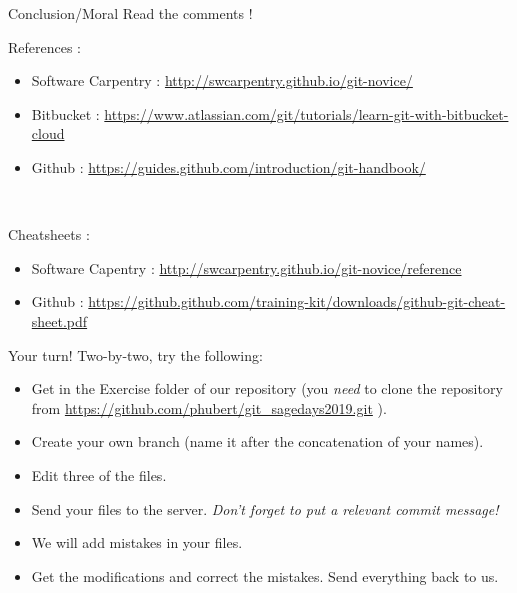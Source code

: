 \documentclass{beamer}
\begin{document}
	\begin{frame}{Conclusion/Moral}
	Read the comments ! \newline
	
	References :
	\begin{itemize}
		\item Software Carpentry : \url{http://swcarpentry.github.io/git-novice/}
		\item Bitbucket :  \url{https://www.atlassian.com/git/tutorials/learn-git-with-bitbucket-cloud}
		\item Github : \url{https://guides.github.com/introduction/git-handbook/}
	\end{itemize}

	~

	Cheatsheets : 
	\begin{itemize}
		\item  Software Capentry : \url{http://swcarpentry.github.io/git-novice/reference}
		\item Github : \url{https://github.github.com/training-kit/downloads/github-git-cheat-sheet.pdf}
	\end{itemize}
	\end{frame}

	\begin{frame}{Your turn!}
	Two-by-two, try the following:
		\begin{itemize}
			\item Get in the Exercise folder of our repository (you \textit{need} to clone the repository from \url{https://github.com/phubert/git_sagedays2019.git} ).
			\item Create your own branch (name it after the concatenation of your names).
			\item Edit three of the files.
			\item Send your files to the server. \textit{Don't forget to put a relevant commit message!}
			\item We will add mistakes in your files.
			\item Get the modifications and correct the mistakes. Send everything back to us.
		\end{itemize}
	\end{frame}
\end{document}
